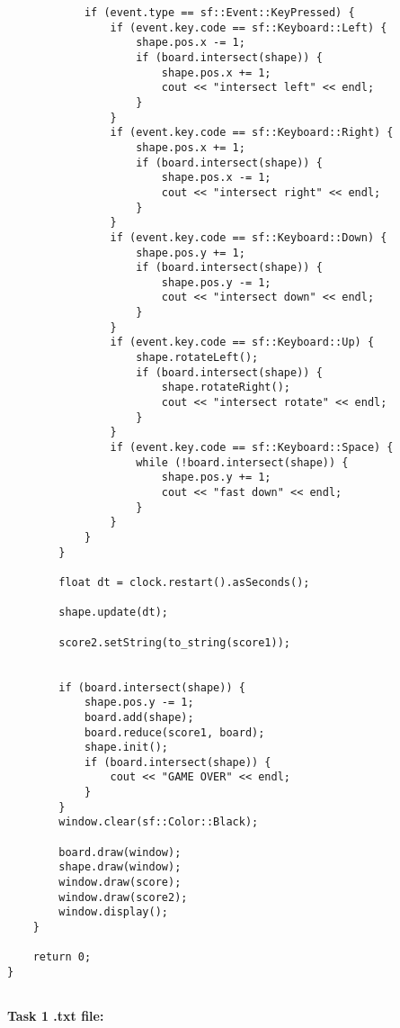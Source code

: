 \documentclass[11pt]{amsart}
\begin{document}
\begin{verbatim}
            if (event.type == sf::Event::KeyPressed) {
                if (event.key.code == sf::Keyboard::Left) {
                    shape.pos.x -= 1;
                    if (board.intersect(shape)) {
                        shape.pos.x += 1;
                        cout << "intersect left" << endl;
                    }
                }
                if (event.key.code == sf::Keyboard::Right) {
                    shape.pos.x += 1;
                    if (board.intersect(shape)) {
                        shape.pos.x -= 1;
                        cout << "intersect right" << endl;
                    }
                }
                if (event.key.code == sf::Keyboard::Down) {
                    shape.pos.y += 1;
                    if (board.intersect(shape)) {
                        shape.pos.y -= 1;
                        cout << "intersect down" << endl;
                    }
                }
                if (event.key.code == sf::Keyboard::Up) {
                    shape.rotateLeft();
                    if (board.intersect(shape)) {
                        shape.rotateRight();
                        cout << "intersect rotate" << endl;
                    }
                }
                if (event.key.code == sf::Keyboard::Space) {
                    while (!board.intersect(shape)) {
                        shape.pos.y += 1;
                        cout << "fast down" << endl;
                    }
                }
            }
        }

        float dt = clock.restart().asSeconds();

        shape.update(dt);

        score2.setString(to_string(score1));


        if (board.intersect(shape)) {
            shape.pos.y -= 1;
            board.add(shape);
            board.reduce(score1, board);
            shape.init();
            if (board.intersect(shape)) {
                cout << "GAME OVER" << endl;
            }
        }
        window.clear(sf::Color::Black);

        board.draw(window);
        shape.draw(window);
        window.draw(score);
        window.draw(score2);
        window.display();
    }

    return 0;
}


\end{verbatim}

\textbf{Task 1 .txt file:}
\end{document}
